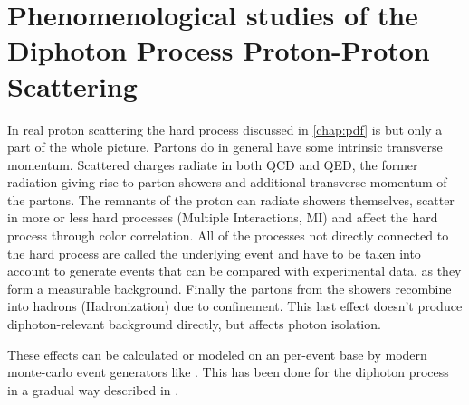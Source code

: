 \chapter{Phenomenological studies of the Diphoton Process Proton-Proton
  Scattering}%
\label{chap:pheno}

In real proton scattering the hard process discussed in
\cref{chap:pdf} is but only a part of the whole picture. Partons do in
general have some intrinsic transverse momentum.  Scattered charges
radiate in both QCD and QED, the former radiation giving rise to
parton-showers and additional transverse momentum of the partons. The
remnants of the proton can radiate showers themselves, scatter in more
or less hard processes (Multiple Interactions, MI) and affect the hard
process through color correlation. All of the processes not directly
connected to the hard process are called the underlying event and have
to be taken into account to generate events that can be compared with
experimental data, as they form a measurable background. Finally the
partons from the showers recombine into hadrons (Hadronization) due to
confinement. This last effect doesn't produce diphoton-relevant
background directly, but affects photon
isolation.~\cite[11]{buckley:2011ge} %

These effects can be calculated or modeled on an per-event base by
modern monte-carlo event generators like \sherpa. This has been done
for the diphoton process in a gradual way described in .


